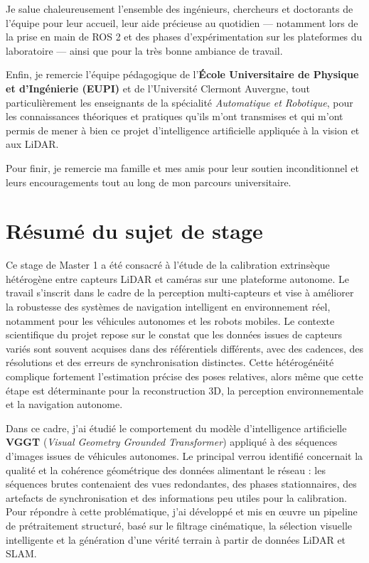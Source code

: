 \documentclass[12pt,a4paper,oneside]{report}
\begin{document}
Je salue chaleureusement l'ensemble des ingénieurs, chercheurs et doctorants de l'équipe pour leur accueil, leur aide précieuse au quotidien — notamment lors de la prise en main de ROS 2 et des phases d'expérimentation sur les plateformes du laboratoire — ainsi que pour la très bonne ambiance de travail.

Enfin, je remercie l'équipe pédagogique de l'\textbf{École Universitaire de Physique et d'Ingénierie (EUPI)} et de l'Université Clermont Auvergne, tout particulièrement les enseignants de la spécialité \textit{Automatique et Robotique}, pour les connaissances théoriques et pratiques qu'ils m'ont transmises et qui m'ont permis de mener à bien ce projet d'intelligence artificielle appliquée à la vision et aux LiDAR.

Pour finir, je remercie ma famille et mes amis pour leur soutien inconditionnel et leurs encouragements tout au long de mon parcours universitaire.

\newpage

\chapter*{Résumé du sujet de stage}
\thispagestyle{empty} %

Ce stage de Master 1 a été consacré à l'étude de la calibration extrinsèque hétérogène entre capteurs LiDAR et caméras sur une plateforme autonome. Le travail s'inscrit dans le cadre de la perception multi-capteurs et vise à améliorer la robustesse des systèmes de navigation intelligent en environnement réel, notamment pour les véhicules autonomes et les robots mobiles. Le contexte scientifique du projet repose sur le constat que les données issues de capteurs variés sont souvent acquises dans des référentiels différents, avec des cadences, des résolutions et des erreurs de synchronisation distinctes. Cette hétérogénéité complique fortement l'estimation précise des poses relatives, alors même que cette étape est déterminante pour la reconstruction 3D, la perception environnementale et la navigation autonome.

Dans ce cadre, j'ai étudié le comportement du modèle d'intelligence artificielle \textbf{VGGT} (\textit{Visual Geometry Grounded Transformer}) appliqué à des séquences d'images issues de véhicules autonomes. Le principal verrou identifié concernait la qualité et la cohérence géométrique des données alimentant le réseau : les séquences brutes contenaient des vues redondantes, des phases stationnaires, des artefacts de synchronisation et des informations peu utiles pour la calibration. Pour répondre à cette problématique, j'ai développé et mis en œuvre un pipeline de prétraitement structuré, basé sur le filtrage cinématique, la sélection visuelle intelligente et la génération d'une vérité terrain à partir de données LiDAR et SLAM.
\end{document}
